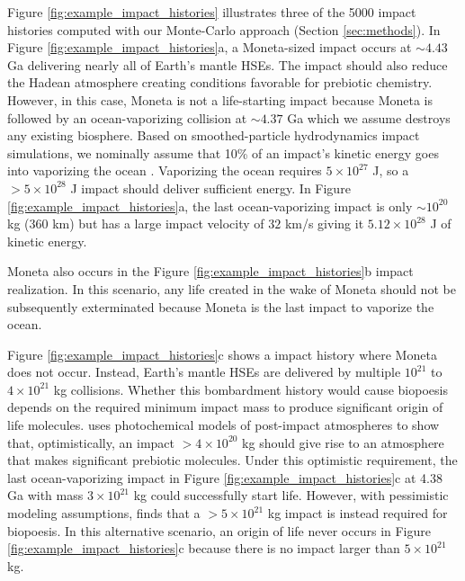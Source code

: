 \documentclass[preprint]{aastex63}
\begin{document}
Figure \ref{fig:example_impact_histories} illustrates three of the 5000 impact histories computed with our Monte-Carlo approach (Section \ref{sec:methods}). In Figure \ref{fig:example_impact_histories}a, a Moneta-sized impact occurs at $\sim 4.43$ Ga delivering nearly all of Earth's mantle HSEs. The impact should also reduce the Hadean atmosphere creating conditions favorable for prebiotic chemistry. However, in this case, Moneta is not a life-starting impact because Moneta is followed by an ocean-vaporizing collision at $\sim 4.37$ Ga which we assume destroys any existing biosphere. Based on smoothed-particle hydrodynamics impact simulations, we nominally assume that 10\% of an impact's kinetic energy goes into vaporizing the ocean \citep[Appendix X,][]{Citron_2022}. Vaporizing the ocean requires $5 \times 10^{27}$ J, so a $> 5 \times 10^{28}$ J impact should deliver sufficient energy. In Figure \ref{fig:example_impact_histories}a, the last ocean-vaporizing impact is only $\sim 10^{20}$ kg (360 km) but has a large impact velocity of $32$ km/s giving it $5.12 \times 10^{28}$ J of kinetic energy. 

Moneta also occurs in the Figure \ref{fig:example_impact_histories}b impact realization. In this scenario, any life created in the wake of Moneta should not be subsequently exterminated because Moneta is the last impact to vaporize the ocean.

Figure \ref{fig:example_impact_histories}c shows a impact history where Moneta does not occur. Instead, Earth's mantle HSEs are delivered by multiple $10^{21}$ to $4 \times 10^{21}$ kg collisions. Whether this bombardment history would cause biopoesis depends on the required minimum impact mass to produce significant origin of life molecules. \citet{Wogan_2023} uses photochemical models of post-impact atmospheres to show that, optimistically, an impact $> 4 \times 10^{20}$ kg should give rise to an atmosphere that makes significant prebiotic molecules. Under this optimistic requirement, the last ocean-vaporizing impact in Figure \ref{fig:example_impact_histories}c at 4.38 Ga with mass $3 \times 10^{21}$ kg could successfully start life. However, with pessimistic modeling assumptions, \citet{Wogan_2023} finds that a $> 5 \times 10^{21}$ kg impact is instead required for biopoesis. In this alternative scenario, an origin of life never occurs in Figure \ref{fig:example_impact_histories}c because there is no impact larger than $5 \times 10^{21}$ kg.
\end{document}
